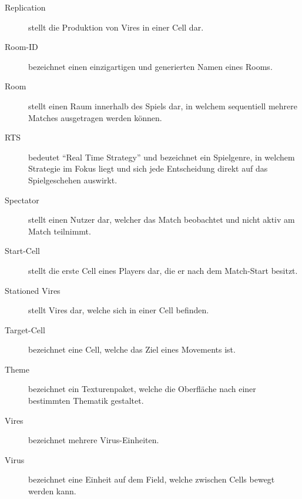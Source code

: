 \begin{description}
	\item[Replication] stellt die Produktion von Vires in einer Cell dar.
	\item[Room-ID] bezeichnet einen einzigartigen und generierten Namen eines Rooms.
	\item[Room] stellt einen Raum innerhalb des Spiels dar, in welchem sequentiell mehrere Matches ausgetragen werden können.
	\item[RTS] bedeutet ``Real Time Strategy'' und bezeichnet ein Spielgenre, in welchem Strategie im Fokus liegt und sich jede Entscheidung direkt auf das Spielgeschehen auswirkt.
	\item[Spectator] stellt einen Nutzer dar, welcher das Match beobachtet und nicht aktiv am Match teilnimmt.
	\item[Start-Cell] stellt die erste Cell eines Players dar, die er nach dem Match-Start besitzt.
	\item[Stationed Vires] stellt Vires dar, welche sich in einer Cell befinden.
	\item[Target-Cell] bezeichnet eine Cell, welche das Ziel eines Movements ist.
	\item[Theme] bezeichnet ein Texturenpaket, welche die Oberfläche nach einer bestimmten Thematik gestaltet.
	\item[Vires] bezeichnet mehrere Virus-Einheiten.
	\item[Virus] bezeichnet eine Einheit auf dem Field, welche zwischen Cells bewegt werden kann.
\end{description}